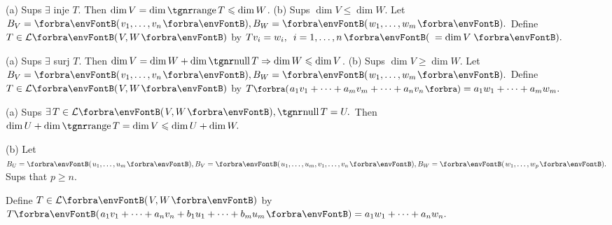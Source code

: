 (a) Sups $\exists$ inje $T$. Then $\dim V=\dim\range T\leqslant\dim W$.\parSol{}
(b) Sups $\dim V\leqslant\dim W.$ Let $B_V=\Par{v_1,\dots,v_n},B_W=\Par{w_1,\dots,w_m}.$\parSol{\Hb}
Define $T\in\Lm{V,W}$ by $Tv_i=w_i,\,\,\,i=1,\dots,n\,\Par{\,=\dim V\,}.$\PfEnd
\SepLine

(a) Sups $\exists$ surj $T$. Then $\dim V=\dim W+\dim\null T\Rightarrow\dim W\leqslant\dim V$.\parSol{}
(b) Sups $\dim V\geqslant\dim W.$ Let $B_V=\Par{v_1,\dots,v_n},B_W=\Par{w_1,\dots,w_m}.$\parSol{\Hb}
Define $T\in\Lm{V,W}$ by $T\BigPar{a_1 v_1+\dots+a_m v_m+\dots+a_n v_n}=a_1 w_1+\dots+a_m w_m.$\PfEnd
\SepLine

\par\quad
(a) Sups $\exists\,T\in\Lm{V,W},\null T=U.$ Then $\dim U+\dim\range T=\dim V\leqslant\dim U+\dim W.$\par\quad
(b) Let $B_U=\Par{u_1,\dots,u_m},B_V=\Par{u_1,\dots,u_m,v_1,\dots,v_n},B_W=\Par{w_1,\dots,w_p}.$ Sups that $p\geqslant n.$\par\quad\Hb
Define $T\in\Lm{V,W}$ by $T\Par{a_1 v_1+\dots+a_n v_n+b_1 u_1+\dots+b_m u_m}=a_1 w_1+\dots+a_n w_n.$\PfEnd
\SepLine\pagebreak


